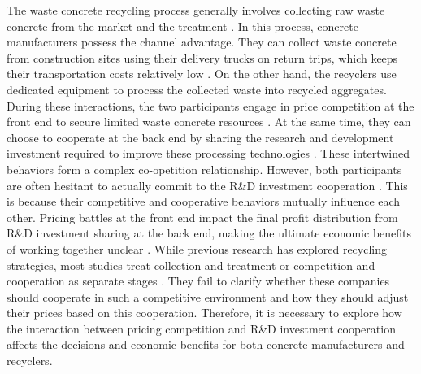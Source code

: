 \documentclass[authoryear,preprint,review,times,10pt]{elsarticle}
\begin{document}
The waste concrete recycling process generally involves collecting raw waste concrete from the market and the treatment \citep{he2020Investigation}. In this process, concrete manufacturers possess the channel advantage. They can collect waste concrete from construction sites using their delivery trucks on return trips, which keeps their transportation costs relatively low \citep{besklubova2026Establishing}. On the other hand, the recyclers use dedicated equipment to process the collected waste into recycled aggregates\citep{chen2025Exploring}. During these interactions, the two participants engage in price competition at the front end to secure limited waste concrete resources \citep{he2020Investigation}. At the same time, they can choose to cooperate at the back end by sharing the research and development investment required to improve these processing technologies \citep{liu2019Expand}. These intertwined behaviors form a complex co-opetition relationship. However, both participants are often hesitant to actually commit to the R\&D investment cooperation \citep{bao2020Developing}. This is because their competitive and cooperative behaviors mutually influence each other. Pricing battles at the front end impact the final profit distribution from R\&D investment sharing at the back end, making the ultimate economic benefits of working together unclear \citep{li2020Key}. While previous research has explored recycling strategies, most studies treat collection and treatment or competition and cooperation as separate stages \citep{hu2021Dynamic,yuan2023Differentiated}. They fail to clarify whether these companies should cooperate in such a competitive environment and how they should adjust their prices based on this cooperation. Therefore, it is necessary to explore how the interaction between pricing competition and R\&D investment cooperation affects the decisions and economic benefits for both concrete manufacturers and recyclers.
\end{document}
